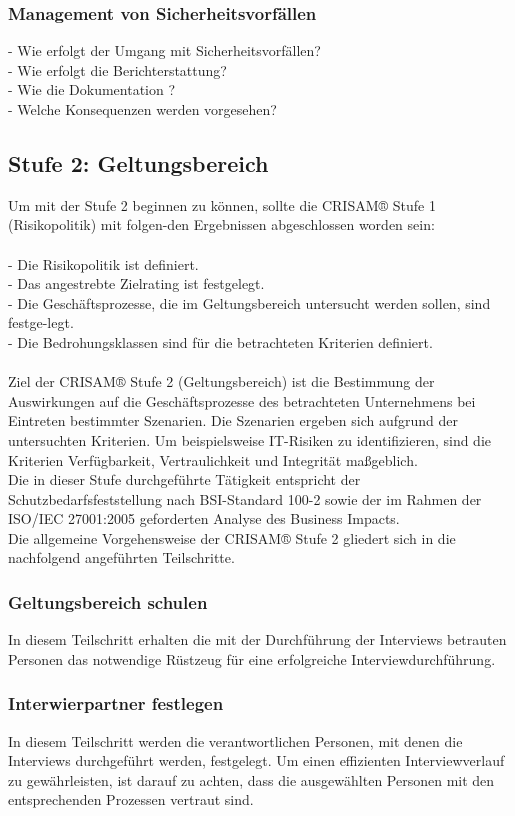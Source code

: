 \subsubsection{Management von Sicherheitsvorfällen}
- Wie erfolgt der Umgang mit Sicherheitsvorfällen?
\\- Wie erfolgt die Berichterstattung?
\\- Wie die Dokumentation ?
\\- Welche Konsequenzen werden vorgesehen?
\newpage
\subsection {Stufe 2: Geltungsbereich}
Um mit der Stufe 2 beginnen zu können, sollte die CRISAM® Stufe 1 (Risikopolitik) mit folgen-den Ergebnissen abgeschlossen worden sein:\\
\\- Die Risikopolitik ist definiert.
\\- Das angestrebte Zielrating ist festgelegt.
\\- Die Geschäftsprozesse, die im Geltungsbereich untersucht werden sollen, sind festge-legt.
\\- Die Bedrohungsklassen sind für die betrachteten Kriterien definiert.\\
\\
Ziel der CRISAM® Stufe 2 (Geltungsbereich) ist die Bestimmung der Auswirkungen auf die Geschäftsprozesse des betrachteten Unternehmens bei Eintreten bestimmter Szenarien. Die Szenarien ergeben sich aufgrund der untersuchten Kriterien. Um beispielsweise IT-Risiken zu identifizieren, sind die Kriterien Verfügbarkeit, Vertraulichkeit und Integrität maßgeblich.\\
Die in dieser Stufe durchgeführte Tätigkeit entspricht der Schutzbedarfsfeststellung nach BSI-Standard 100-2 sowie der im Rahmen der ISO/IEC 27001:2005 geforderten Analyse des Business Impacts.\\
Die allgemeine Vorgehensweise der CRISAM® Stufe 2 gliedert sich in die nachfolgend angeführten Teilschritte.
\subsubsection{Geltungsbereich schulen}
In diesem Teilschritt erhalten die mit der Durchführung der Interviews betrauten Personen das notwendige Rüstzeug für eine erfolgreiche Interviewdurchführung.
\subsubsection{Interwierpartner festlegen}
In diesem Teilschritt werden die verantwortlichen Personen, mit denen die Interviews durchgeführt werden, festgelegt. Um einen effizienten Interviewverlauf zu gewährleisten, ist darauf zu achten, dass die ausgewählten Personen mit den entsprechenden Prozessen vertraut sind.
